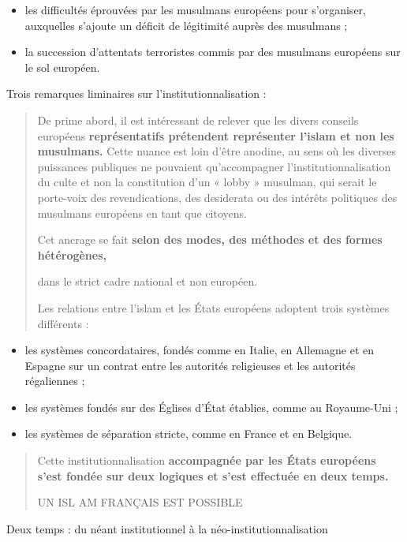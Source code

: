 \begin{itemize}
\item
  les difficultés éprouvées par les musulmans européens pour
  s'organiser, auxquelles s'ajoute un déficit de légitimité auprès des
  musulmans ;
\item
  la succession d'attentats terroristes commis par des musulmans
  européens sur le sol européen.
\end{itemize}

Trois remarques liminaires sur l'institutionnalisation :

\begin{quote}
De prime abord, il est intéressant de relever que les divers conseils
européens \textbf{représentatifs prétendent représenter l'islam et non
les musulmans.} Cette nuance est loin d'être anodine, au sens où les
diverses puissances publiques ne pouvaient qu'accompagner
l'institutionnalisation du culte et non la constitution d'un « lobby »
musulman, qui serait le porte-voix des revendications, des desiderata ou
des intérêts politiques des musulmans européens en tant que citoyens.

Cet ancrage se fait \textbf{selon des modes, des méthodes et des formes
hétérogènes,}

dans le strict cadre national et non européen.

Les relations entre l'islam et les États européens adoptent trois
systèmes différents :
\end{quote}

\begin{itemize}
\item
  les systèmes concordataires, fondés comme en Italie, en Allemagne et
  en Espagne sur un contrat entre les autorités religieuses et les
  autorités régaliennes ;
\item
  les systèmes fondés sur des Églises d'État établies, comme au
  Royaume-Uni ;
\item
  les systèmes de séparation stricte, comme en France et en Belgique.
\end{itemize}

\begin{quote}
Cette institutionnalisation \textbf{accompagnée par les États européens
s'est fondée sur deux logiques et s'est effectuée en deux temps.}

UN ISL AM FRANÇAIS EST POSSIBLE
\end{quote}

Deux temps : du néant institutionnel à la néo-institutionnalisation

